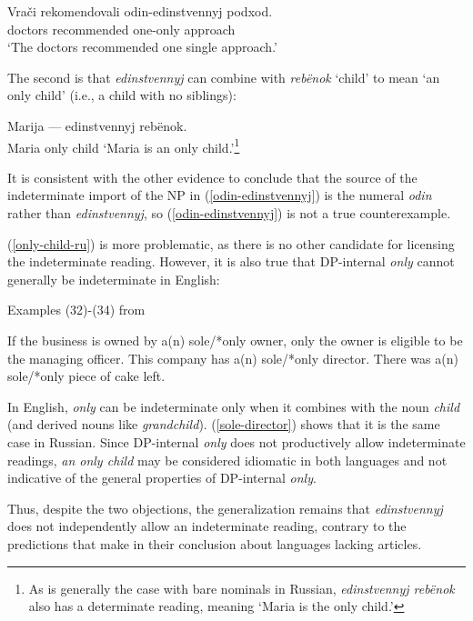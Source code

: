 \begin{exe}
	\ex \label{odin-edinstvennyj} \gll Vra\v{c}i rekomendovali odin-edinstvennyj podxod.\\
	doctors recommended one-only approach\\
	`The doctors recommended one single approach.'
\end{exe}

The second is that \textit{edinstvennyj} can combine with \textit{reb\"{e}nok} `child' to mean `an only child' (i.e., a child with no siblings):

\begin{exe}
	\ex \label{only-child-ru} Marija --- edinstvennyj reb\"{e}nok.\\
	Maria {} only child
	\glt `Maria is an only child.'\footnote{As is generally the case with bare nominals in Russian, \textit{edinstvennyj reb\"{e}nok} also has a determinate reading, meaning `Maria is the only child.'}
\end{exe}

It is consistent with the other evidence to conclude that the source of the indeterminate import of the NP in (\ref{odin-edinstvennyj}) is the numeral \textit{odin} rather than \textit{edinstvennyj}, so (\ref{odin-edinstvennyj}) is not a true counterexample.

(\ref{only-child-ru}) is more problematic, as there is no other candidate for licensing the indeterminate reading. However, it is also true that DP-internal \textit{only} cannot generally be indeterminate in English:


\begin{exe}
	\ex Examples (32)-(34) from \citet{cb2012a} \begin{xlist}
		\ex If the business is owned by a(n) sole/*only owner, only the owner is eligible to be the managing officer.
		\ex This company has a(n) sole/*only director.
		\ex There was a(n) sole/*only piece of cake left.
	\end{xlist}
\end{exe}

In English, \textit{only} can be indeterminate only when it combines with the noun \textit{child} (and derived nouns like \textit{grandchild}). (\ref{sole-director}) shows that it is the same case in Russian. Since DP-internal \textit{only} does not productively allow indeterminate readings, \textit{an only child} may be considered idiomatic in both languages and not indicative of the general properties of DP-internal \textit{only}.

Thus, despite the two objections, the generalization remains that \textit{edinstvennyj} does not independently allow an indeterminate reading, contrary to the predictions that \citet{cb2015} make in their conclusion about languages lacking articles.